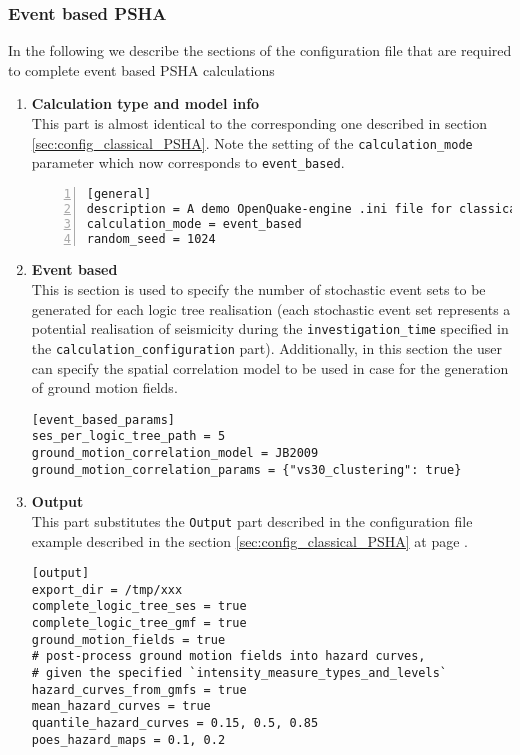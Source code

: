 \subsubsection{Event based PSHA}
%
In the following we describe the sections of the configuration file 
that are required to complete event based PSHA calculations 
\begin{enumerate}
\item \textbf{Calculation type and model info} \hfill \\
    This part is almost identical to the corresponding one 
    described in section \ref{sec:config_classical_PSHA}. Note
    the setting of the \texttt{cal\-cu\-lation\_mode} parameter
    which now corresponds to \texttt{event\_based}.
\begin{Verbatim}[frame=single, commandchars=\\\{\}, fontsize=\small,
    numbers=left, numbersep=2pt]
[general]
description = A demo OpenQuake-engine .ini file for classical PSHA
calculation_mode = event_based
random_seed = 1024
\end{Verbatim}
%
\item \textbf{Event based} \hfill \\
This is section is used to specify the number of stochastic 
event sets to be generated for each logic tree realisation 
(each stochastic event set represents a potential realisation of seismicity
during the \texttt{in\-ves\-ti\-gation\_time} specified in the 
\texttt{calculation\_configuration} part).
Additionally, in this section the user can specify the spatial correlation
model to be used in case for the generation of ground motion fields. 
\begin{Verbatim}[frame=single, commandchars=\\\{\}, fontsize=\small]
[event_based_params]
ses_per_logic_tree_path = 5
ground_motion_correlation_model = JB2009
ground_motion_correlation_params = {"vs30_clustering": true}
\end{Verbatim}
%
\item \textbf{Output} \hfill \\
This part substitutes the \texttt{Output} part described in 
the configuration file example described in the section 
\ref{sec:config_classical_PSHA}
at page \pageref{sec:config_classical_PSHA}.
\begin{Verbatim}[frame=single, commandchars=\\\{\}, fontsize=\small]
[output]
export_dir = /tmp/xxx
complete_logic_tree_ses = true
complete_logic_tree_gmf = true
ground_motion_fields = true
# post-process ground motion fields into hazard curves,
# given the specified `intensity_measure_types_and_levels`
hazard_curves_from_gmfs = true
mean_hazard_curves = true
quantile_hazard_curves = 0.15, 0.5, 0.85
poes_hazard_maps = 0.1, 0.2
\end{Verbatim}
%
\end{enumerate}
